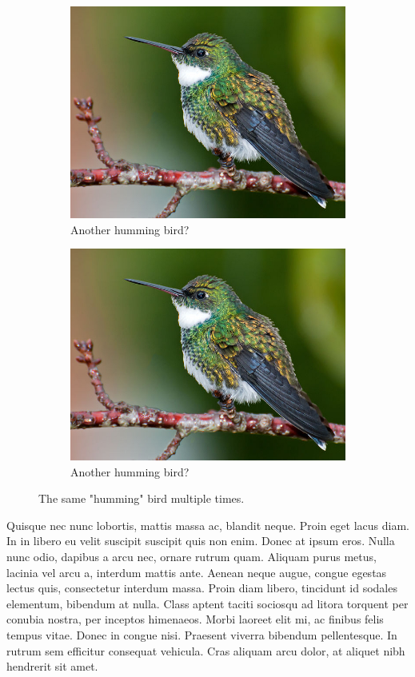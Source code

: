 \documentclass{article}
\begin{document}
\begin{figure}[h]
\begin{subfigure}[b]{0.3\linewidth}
    \includegraphics[width=\linewidth]{bird.jpg}
    \caption{Another humming bird?}
  \end{subfigure}
  \begin{subfigure}[b]{0.3\linewidth}
    \includegraphics[width=\linewidth]{bird.jpg}
    \caption{Another humming bird?}
  \end{subfigure}
  \caption{The same "humming" bird multiple times.}
  \label{rats}
\end{figure}


Quisque nec nunc lobortis, mattis massa ac, blandit neque. Proin eget lacus diam. In in libero eu velit suscipit suscipit quis non enim. Donec at ipsum eros. Nulla nunc odio, dapibus a arcu nec, ornare rutrum quam. Aliquam purus metus, lacinia vel arcu a, interdum mattis ante. Aenean neque augue, congue egestas lectus quis, consectetur interdum massa. Proin diam libero, tincidunt id sodales elementum, bibendum at nulla. Class aptent taciti sociosqu ad litora torquent per conubia nostra, per inceptos himenaeos. Morbi laoreet elit mi, ac finibus felis tempus vitae. Donec in congue nisi. Praesent viverra bibendum pellentesque. In rutrum sem efficitur consequat vehicula. Cras aliquam arcu dolor, at aliquet nibh hendrerit sit amet.
\end{document}
